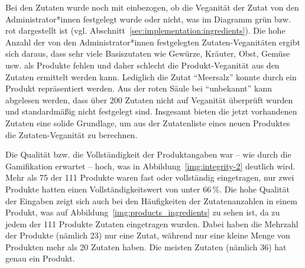 Bei den Zutaten wurde noch mit einbezogen, ob 
die Veganität der Zutat von den Administrator*innen festgelegt wurde oder 
nicht, was im Diagramm grün bzw. rot dargestellt ist (vgl. 
Abschnitt~\ref{sec:implementation:ingredients}). Die hohe Anzahl der von den 
Administrator*innen festgelegten Zutaten-Veganitäten ergibt sich daraus, dass 
sehr viele Basiszutaten wie Gewürze, Kräuter, Obst, Gemüse usw. als Produkte 
fehlen und daher schlecht die Produkt-Veganität aus den Zutaten ermittelt werden 
kann. Lediglich die Zutat "`Meersalz"' konnte durch ein Produkt repräsentiert 
werden.
Aus der roten Säule bei "`unbekannt"' kann abgelesen werden, dass über 200 
Zutaten nicht auf Veganität überprüft wurden und standardmäßig nicht 
festgelegt sind.
Insgesamt bieten die jetzt vorhandenen Zutaten eine solide Grundlage, um 
aus der Zutatenliste eines neuen Produktes die Zutaten-Veganität zu berechnen.

Die Qualität bzw. die Vollständigkeit der Produktangaben war -- wie durch die 
Gamifikation erwartet -- hoch, was in Abbildung~\ref{img:integrity-2} deutlich 
wird. Mehr als 75 der 111 Produkte waren fast oder vollständig eingetragen, nur 
zwei Produkte hatten einen Vollständigkeitswert von unter 66\,\%.
Die hohe Qualität der Eingaben zeigt sich auch bei den Häufigkeiten der 
Zutatenanzahlen in einem Produkt, was auf 
Abbildung~\ref{img:products_ingredients} zu sehen ist, da zu jedem der 111 
Produkte Zutaten eingetragen wurden. Dabei haben die Mehrzahl der Produkte 
(nämlich 23) nur eine Zutat, während nur eine kleine Menge von Produkten mehr 
als 20 Zutaten haben. Die meisten Zutaten (nämlich 36) hat genau ein Produkt.

